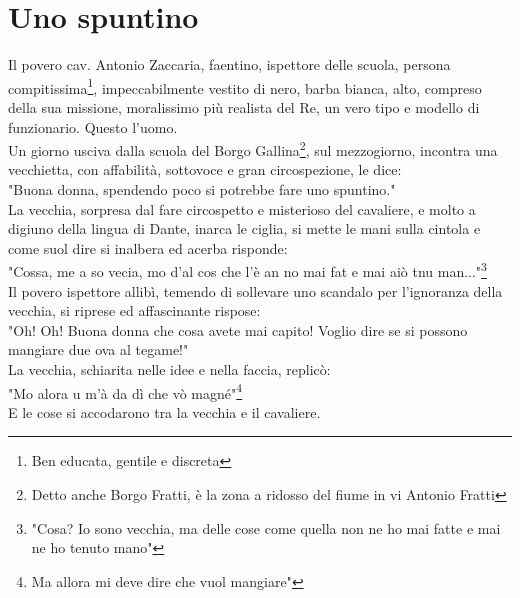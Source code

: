 
\chapter{Uno spuntino}
Il povero cav. Antonio Zaccaria, faentino, ispettore delle scuola, persona compitissima\footnote{Ben educata, gentile e discreta}, impeccabilmente vestito di nero, barba bianca, alto, compreso della sua missione, moralissimo più realista del Re, un vero tipo e modello di funzionario. Questo l'uomo.\\
Un giorno usciva dalla scuola del Borgo Gallina\footnote{Detto anche Borgo Fratti, è la zona a ridosso del fiume in vi Antonio Fratti}, sul mezzogiorno, incontra una vecchietta, con affabilità, sottovoce e gran circospezione, le dice:\\
"Buona donna, spendendo poco si potrebbe fare uno spuntino."\\
La vecchia, sorpresa dal fare circospetto e misterioso del cavaliere, e molto a digiuno della lingua di Dante, inarca le ciglia, si mette le mani sulla cintola e come suol dire si inalbera ed acerba risponde:\\
"Cossa, me a so vecia, mo d'al cos che l'è an no mai fat e mai aiò tnu man..."\footnote{"Cosa? Io sono vecchia, ma delle cose come quella non ne ho mai fatte e mai ne ho tenuto mano"}\\
Il povero ispettore allibì, temendo di sollevare uno scandalo per l'ignoranza della vecchia, si riprese ed affascinante rispose:\\
"Oh! Oh! Buona donna che cosa avete mai capito! Voglio dire se si possono mangiare due ova al tegame!"\\
La vecchia, schiarita nelle idee e nella faccia, replicò:\\
"Mo alora u m'à da dì che vò magné"\footnote{Ma allora mi deve dire che vuol mangiare"}\\
E le cose si accodarono tra la vecchia e il cavaliere.
